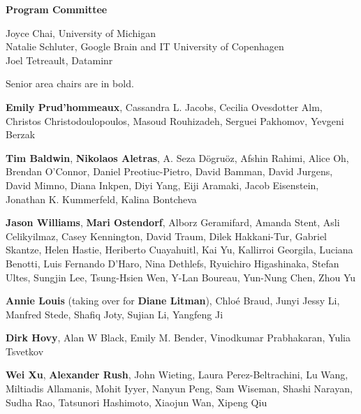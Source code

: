 \documentclass[11pt]{article}
\newcommand{\aclitem}[1][]{\item[#1:\vspace{2mm}]}
\begin{document}
\pagebreak

\begin{center}
  {\Large \textbf{Program Committee}}
\end{center}

\begin{description}[itemsep=4mm, style=nextline]

\aclitem[Program Chairs]
Joyce Chai, University of Michigan\\
Natalie Schluter, Google Brain and IT University of Copenhagen\\
Joel Tetreault, Dataminr

\item[Senior Area Chairs and Area Chairs:]
Senior area chairs are in bold.

\begin{description}[itemsep=4mm, style=nextline]
\aclitem[Cognitive Modeling and Psycholinguistics]
\textbf{Emily Prud'hommeaux},
Cassandra L. Jacobs, Cecilia Ovesdotter Alm, Christos Christodou\-lopoulos, Masoud Rouhizadeh, Serguei Pakhomov, Yevgeni Berzak

\aclitem[Computational Social Science and Social Media]
\textbf{Tim Baldwin},
\textbf{Nikolaos Aletras},
A. Seza D\"{o}gru\"{o}z, Afshin Rahimi, Alice Oh, Brendan O'Connor, Daniel Preotiuc-Pietro, David Bamman, David Jurgens, David Mimno, Diana Inkpen, Diyi Yang, Eiji Aramaki, Jacob Eisenstein, Jonathan K. Kummerfeld, Kalina Bontcheva

\aclitem[Dialogue and Interactive Systems]
\textbf{Jason Williams},
\textbf{Mari Ostendorf},
Alborz Geramifard, Amanda Stent, Asli Celikyilmaz, Casey Kennington, David Traum, Dilek Hakkani-Tur, Gabriel Skantze, Helen Hastie, Heriberto Cuayahuitl, Kai Yu, Kallirroi Georgila, Luciana Benotti, Luis Fernando D'Haro, Nina Dethlefs, Ryuichiro Higashinaka, Stefan Ultes, Sungjin Lee, Tsung-Hsien Wen, Y-Lan Boureau, Yun-Nung Chen, Zhou Yu

\aclitem[Discourse and Pragmatics]
\textbf{Annie Louis} (taking over for \textbf{Diane Litman}),
Chlo\'{e} Braud, Junyi Jessy Li, Manfred Stede, Shafiq Joty, Sujian Li, Yangfeng Ji

\aclitem[Ethics and NLP]
\textbf{Dirk Hovy},
Alan W Black, Emily M. Bender, Vinodkumar Prabhakaran, Yulia Tsvetkov

\aclitem[Generation]
\textbf{Wei Xu},
\textbf{Alexander Rush},
John Wieting, Laura Perez-Beltrachini, Lu Wang, Miltiadis Allamanis, Mohit Iyyer, Nanyun Peng, Sam Wiseman, Shashi Narayan, Sudha Rao, Tatsunori Hashimoto, Xiaojun Wan, Xipeng Qiu


\end{description}
\end{description}
\end{document}
